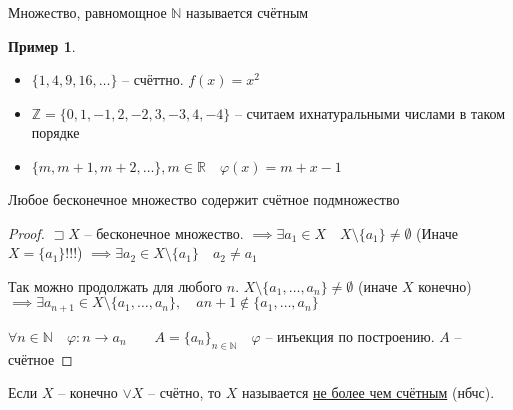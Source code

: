 \documentclass{book}
\newcommand\N{\ensuremath{\mathbb{N}}}
\newcommand\R{\ensuremath{\mathbb{R}}}
\newcommand\Z{\ensuremath{\mathbb{Z}}}
\renewcommand\O{\ensuremath{\emptyset}}
\renewcommand\phi{\varphi}
\theoremstyle{definition}
\newtheorem*{example}{Пример}
\begin{document}
    \begin{definition}
        Множество, равномощное $\N $ называется счётным
    \end{definition}
    \begin{example}
        \begin{itemize}
            \item $\{1, 4, 9, 16, \ldots\}$ -- счёттно. $f(x) = x^2$
            \item $\Z  = \{0,1,-1,2,-2,3,-3,4,-4\}$ -- считаем ихнатуральными числами  в таком порядке
            \item $\{m, m+1, m+2, \ldots\}, m\in \R\quad \phi(x) = m+x-1$
        \end{itemize}
    \end{example}
    \begin{theorem}
        Любое бесконечное множество содержит счётное подмножество
    \end{theorem}
    \begin{proof}
        $\sqsupset X$ -- бесконечное множество. $\implies  \exists a_1\in X\quad X\setminus \{a_1   \}\neq \O $ (Иначе $X = \{a_1\}$!!!) $\implies \exists a_2\in X\setminus \{a_1\}\quad a_2\neq a_1$

        Так можно продолжать для любого $n$. $X\setminus \{a_1, \ldots, a_n\}\neq \O $ (иначе $X$ конечно) $\implies \exists a_{n+1}\in X\setminus \{a_1, \ldots, a_n\}, \quad a{n+1}\not\in \{a_1, \ldots, a_n\}$

        $\forall n\in \N \quad \phi: n\to a_n\qquad A = \{a_n\}_{n\in \N }\quad \phi$ -- инъекция по построению. $A$ -- счётное
    \end{proof}

    \begin{definition}
        Если $X$ -- конечно $\vee X$ -- счётно, то $X$ называется \underline{не более чем счётным} (нбчс).
    \end{definition} 
\end{document}
